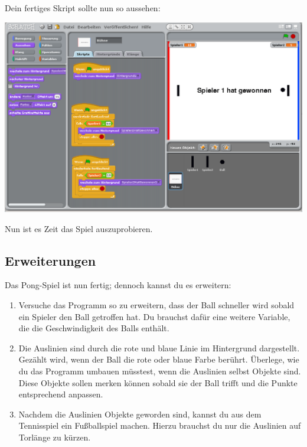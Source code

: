 Dein fertiges Skript sollte nun so aussehen: 

\includegraphics[width=1\textwidth]{images/aufgabe5_pong_spieler_variablen_3.png}

Nun ist es Zeit das Spiel auszuprobieren.

\subsection{Erweiterungen}
Das Pong-Spiel ist nun fertig; dennoch kannst du es erweitern:

\begin{enumerate}
\item Versuche das Programm so zu erweitern, dass der Ball schneller wird sobald ein Spieler den Ball getroffen hat. Du brauchst dafür eine weitere Variable, die die Geschwindigkeit des Balls enthält.
\item Die Auslinien sind durch die rote und blaue Linie im Hintergrund dargestellt. Gezählt wird, wenn der Ball die rote oder blaue Farbe berührt. Überlege, wie du das Programm umbauen müsstest, wenn die Auslinien selbst Objekte sind. Diese Objekte sollen merken können sobald sie der Ball trifft und die Punkte entsprechend anpassen.
\item Nachdem die Auslinien Objekte geworden sind, kannst du aus dem Tennisspiel ein Fußballspiel machen. Hierzu brauchst du nur die Auslinien auf Torlänge zu kürzen. 
\end{enumerate}








